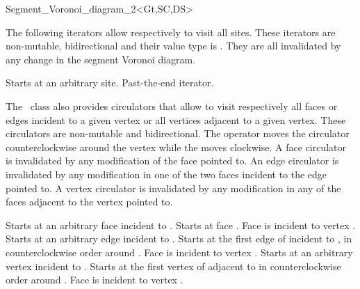 \begin{ccRefClass}{Segment_Voronoi_diagram_2<Gt,SC,DS>}

The following iterators allow respectively to visit 
all sites. These iterators are non-mutable, bidirectional and their
value type is . They are all invalidated by any change in
the segment Voronoi diagram.


{Starts at an arbitrary site.}
\ccGlue
{}
{Past-the-end iterator.}


\ccThreeToTwo




The \ccRefName\ class also provides
circulators that allow to visit
respectively all faces or edges incident to a given vertex
or all vertices adjacent to a given vertex.
These circulators are non-mutable and bidirectional.
The operator  moves the circulator
counterclockwise around the vertex while
the  moves clockwise.
A face circulator is invalidated by any modification of the face
pointed to.
An edge circulator is invalidated by any modification
in one of the two faces incident to the edge pointed to.
A vertex circulator is invalidated by any modification
in any of the faces adjacent to the vertex pointed to.

{Starts at an arbitrary face incident
to .}
\ccGlue
{}
{Starts at face .
\ccPrecond Face  is incident to vertex .}
\ccGlue
{}
{Starts at an arbitrary edge incident
to .}
\ccGlue
{}
{Starts at the first edge of  incident to 
, in counterclockwise order around .
\ccPrecond Face  is incident to vertex .}
\ccGlue
{}
{Starts at an arbitrary  vertex incident
to .}
\ccGlue
{}
{Starts at the first vertex of  adjacent  to 
in  counterclockwise order around .
\ccPrecond Face  is incident to vertex .}





\end{ccRefClass}
